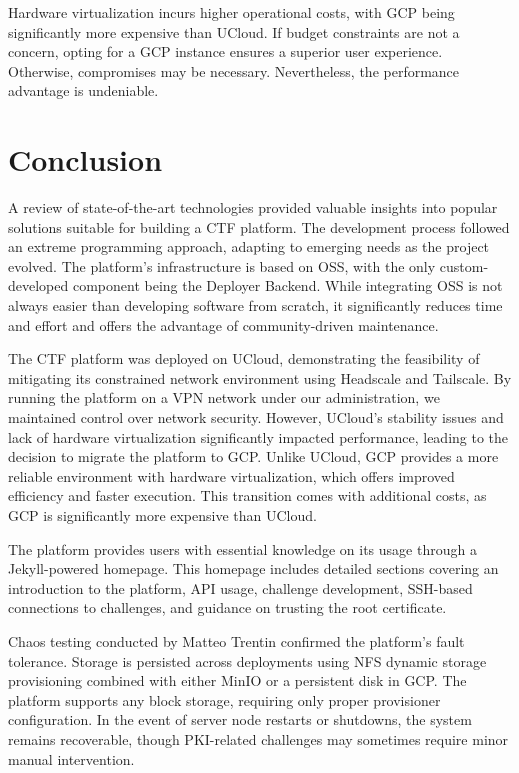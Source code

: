 Hardware virtualization incurs higher operational costs, with GCP being significantly more expensive than UCloud. If budget constraints are not a concern, opting for a GCP instance ensures a superior user experience. Otherwise, compromises may be necessary. Nevertheless, the performance advantage is undeniable.

\chapter{Conclusion}
A review of state-of-the-art technologies provided valuable insights into popular solutions suitable for building a CTF platform. The development process followed an extreme programming approach, adapting to emerging needs as the project evolved. The platform's infrastructure is based on OSS, with the only custom-developed component being the Deployer Backend. While integrating OSS is not always easier than developing software from scratch, it significantly reduces time and effort and offers the advantage of community-driven maintenance.

The CTF platform was deployed on UCloud, demonstrating the feasibility of mitigating its constrained network environment using Headscale and Tailscale. By running the platform on a VPN network under our administration, we maintained control over network security. However, UCloud's stability issues and lack of hardware virtualization significantly impacted performance, leading to the decision to migrate the platform to GCP. Unlike UCloud, GCP provides a more reliable environment with hardware virtualization, which offers improved efficiency and faster execution. This transition comes with additional costs, as GCP is significantly more expensive than UCloud.

The platform provides users with essential knowledge on its usage through a Jekyll-powered homepage. This homepage includes detailed sections covering an introduction to the platform, API usage, challenge development, SSH-based connections to challenges, and guidance on trusting the root certificate.

Chaos testing conducted by Matteo Trentin confirmed the platform's fault tolerance. Storage is persisted across deployments using NFS dynamic storage provisioning combined with either MinIO or a persistent disk in GCP. The platform supports any block storage, requiring only proper provisioner configuration. In the event of server node restarts or shutdowns, the system remains recoverable, though PKI-related challenges may sometimes require minor manual intervention.

